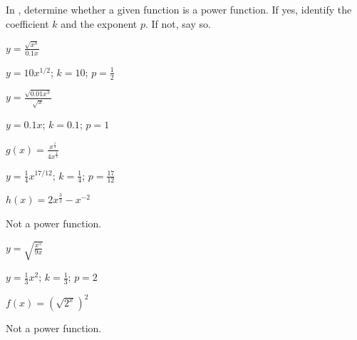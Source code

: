 

\noindent In , determine whether a given function is a power function. If yes, identify the coefficient $k$ and the exponent $p$. If not, say so.

\begin{exercise}\label{exercise-4.4.1}
$\displaystyle y= \frac{\sqrt{x^3}}{0.1x}$
\end{exercise}

\begin{solution}
$y=10x^{1/2}$; $k=10$; $p=\frac{1}{2}$
\end{solution}


\begin{exercise}
$\displaystyle y= \frac{\sqrt{0.01x^3}}{\sqrt{x}}$
\end{exercise}

\begin{solution}
$y=0.1x$; $k=0.1$; $p=1$
\end{solution}


\begin{exercise}
$\displaystyle g(x)=\frac{x^{\frac{5}{3}}}{4x^{\frac{1}{4}}}$
\end{exercise}

\begin{solution}
$y=\frac{1}{4}x^{17/12}$; $k=\frac{1}{4}$; $p=\frac{17}{12}$
\end{solution}


\begin{exercise}
$\displaystyle h(x)=2x^{\frac{3}{2}}-x^{-2}$
\end{exercise}

\begin{solution}
Not a power function.
\end{solution}


\begin{exercise}
$\displaystyle y=\sqrt{\frac{x^5}{9x}}$
\end{exercise}

\begin{solution}
$y=\frac{1}{3}x^2$; $k=\frac{1}{3}$; $p=2$
\end{solution}


\begin{exercise}\label{exercise-4.4.6}
$\displaystyle f(x)=(\sqrt{2^x})^2$
\end{exercise}

\begin{solution}
Not a power function.
\end{solution}








